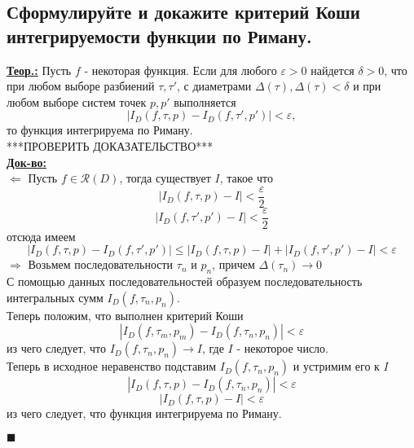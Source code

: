 
\subsection{Сформулируйте и докажите критерий Коши интегрируемости функции по Риману.}

\textbf{\underline{Теор.:} } Пусть $f$ - некоторая функция. Если для любого $\varepsilon > 0$ найдется $\delta > 0$, что при любом выборе разбиений $\tau, \tau'$, с диаметрами $\Delta(\tau), \Delta(\tau) < \delta$ и при любом выборе систем точек $p, p'$ выполняется 
\[|I_D(f, \tau, p) - I_D(f, \tau', p')| < \varepsilon,\]
то функция интегрируема по Риману.\\
***ПРОВЕРИТЬ ДОКАЗАТЕЛЬСТВО*** \\
\textbf{\underline{Док-во:} } \\
$\Leftarrow$ Пусть $f \in \mathcal{R}(D)$, тогда существует $I$, такое что 
\[|I_D(f, \tau, p) - I| < \frac{\varepsilon}{2}\]
\[|I_D(f, \tau', p') - I| < \frac{\varepsilon}{2}\]
отсюда имеем
\[|I_D(f, \tau, p) - I_D(f, \tau', p')| \leq |I_D(f, \tau, p) - I| + |I_D(f, \tau', p') - I| < \varepsilon\]
$\Rightarrow$ Возьмем последовательности $\tau_n$ и $p_n$, причем $\Delta(\tau_n) \rightarrow 0$ \\
С помощью данных последовательностей образуем последовательность интегральных сумм $I_D(f, \tau_n, p_n)$. \\
Теперь положим, что выполнен критерий Коши
\[|I_D(f, \tau_m, p_m) - I_D(f, \tau_n, p_n)| < \varepsilon\]
из чего следует, что $I_D(f, \tau_n, p_n) \rightarrow I$, где $I$ - некоторое число. \\
Теперь в исходное неравенство подставим $I_D(f, \tau_n, p_n)$ и устримим его к $I$
\[|I_D(f, \tau, p) - I_D(f, \tau_n, p_n)| < \varepsilon\]
\[|I_D(f, \tau, p) - I| < \varepsilon\] 
из чего следует, что функция интегрируема по Риману.
\begin{flushright}
$\blacksquare$
\end{flushright}



